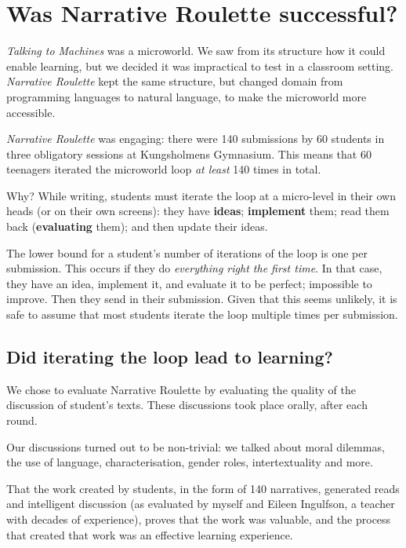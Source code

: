 \section{Was Narrative Roulette successful?}

\emph{Talking to Machines} was a microworld. We saw from its structure
how it could enable learning, but we decided it was impractical to test
in a classroom setting. \emph{Narrative Roulette} kept the same
structure, but changed domain from programming languages to natural
language, to make the microworld more accessible.

\emph{Narrative Roulette} was engaging: there were
140 submissions by 60 students in three obligatory sessions at Kungsholmens Gymnasium. This means that 60 teenagers iterated the microworld
loop \emph{at least} 140 times in total.

Why? While writing, students must iterate the loop at a micro-level in
their own heads (or on their own screens): they have \textbf{ideas}; \textbf{implement}
them; read them back (\textbf{evaluating} them); and then update their ideas. 

The lower bound for a student's number of iterations of the loop is one per submission. This occurs if they do \emph{everything right the first time}. In that case,
they have an idea, implement it, and evaluate it to be perfect;
impossible to improve. Then they send in their submission. Given that this seems unlikely, it is safe to assume that most students iterate the loop multiple times
per submission.

\subsection{Did iterating the loop lead to learning?}

We chose to evaluate Narrative Roulette by evaluating the quality of the discussion of student's texts. These discussions took place orally, after each round. 

Our discussions turned out to be non-trivial: we talked about moral dilemmas, the use of language, characterisation, gender roles, intertextuality and more\cite{ingulfson}. 

That the work created by students, in the form of 140 narratives, generated reads and intelligent discussion (as evaluated by myself and Eileen Ingulfson\cite{ingulfson}, a teacher with decades of experience), proves that the work was valuable, and the process that created that work was an effective learning experience.

